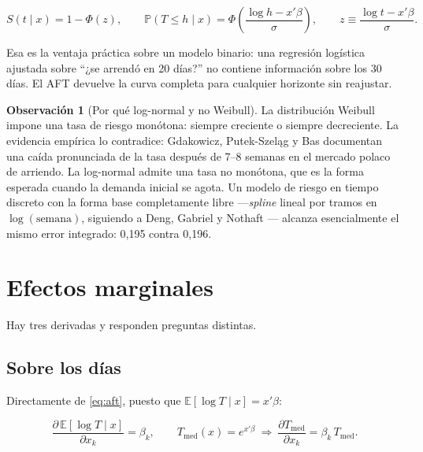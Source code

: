 \documentclass[11pt,a4paper]{article}
\theoremstyle{definition}
\newtheorem{observacion}{Observación}
\newcommand{\E}{\mathbb{E}}
\newcommand{\Prob}{\mathbb{P}}
\begin{document}
\begin{equation}
S(t\mid x)=1-\Phi(z),
\qquad
\Prob(T\le h\mid x)=\Phi\!\left(\frac{\log h-x'\beta}{\sigma}\right),
\qquad
z\equiv\frac{\log t-x'\beta}{\sigma}.
\label{eq:curva}
\end{equation}

Esa es la ventaja práctica sobre un modelo binario: una regresión logística
ajustada sobre ``¿se arrendó en 20 días?'' no contiene información sobre los 30
días. El AFT devuelve la curva completa para cualquier horizonte sin reajustar.

\begin{observacion}[Por qué log-normal y no Weibull]
La distribución Weibull impone una tasa de riesgo monótona: siempre creciente o
siempre decreciente. La evidencia empírica lo contradice: Gdakowicz, Putek-Szeląg
y Bas \cite{gdakowicz2023} documentan una caída pronunciada de la tasa después de
7--8 semanas en el mercado polaco de arriendo. La log-normal admite una tasa no
monótona, que es la forma esperada cuando la demanda inicial se agota. Un modelo
de riesgo en tiempo discreto con la forma base completamente libre ---\emph{spline}
lineal por tramos en $\log(\text{semana})$, siguiendo a Deng, Gabriel y Nothaft
\cite{deng2003}--- alcanza esencialmente el mismo error integrado: 0,195 contra
0,196.
\end{observacion}

\section{Efectos marginales}

Hay tres derivadas y responden preguntas distintas.

\subsection{Sobre los días}

Directamente de \eqref{eq:aft}, puesto que $\E[\log T\mid x]=x'\beta$:

\begin{equation}
\frac{\partial\,\E[\log T\mid x]}{\partial x_k}=\beta_k,
\qquad
T_{\mathrm{med}}(x)=e^{x'\beta}
\ \Longrightarrow\
\frac{\partial T_{\mathrm{med}}}{\partial x_k}=\beta_k\,T_{\mathrm{med}}.
\label{eq:dias}
\end{equation}
\end{document}
